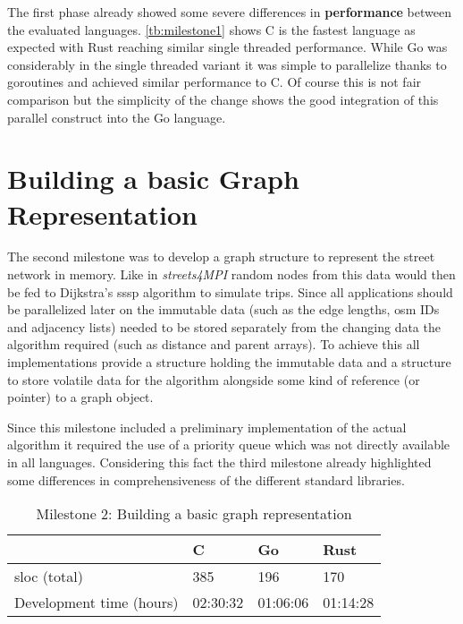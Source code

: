 The first phase already showed some severe differences in \textbf{performance} between the evaluated languages. \autoref{tb:milestone1} shows C is the fastest language as expected with Rust reaching similar single threaded performance. While Go was considerably in the single threaded variant it was simple to parallelize thanks to \glspl{goroutine} and achieved similar performance to C. Of course this is not fair comparison but the simplicity of the change shows the good integration of this parallel construct into the Go language.

\section{Building a basic Graph Representation}
\label{sec:Implementation::Graph_Representation}

The second milestone was to develop a graph structure to represent the street network in memory. Like in \textit{streets4MPI} random nodes from this data would then be fed to Dijkstra's \acrshort{sssp} algorithm to simulate trips. Since all applications should be parallelized later on the immutable data (such as the edge lengths, \gls{osm} IDs and adjacency lists) needed to be stored separately from the changing data the algorithm required (such as distance and parent arrays). To achieve this all implementations provide a  structure holding the immutable data and a  structure to store volatile data for the algorithm alongside some kind of reference (or pointer) to a graph object.

Since this milestone included a preliminary implementation of the actual algorithm it required the use of a priority queue which was not directly available in all languages. Considering this fact the third milestone already highlighted some differences in comprehensiveness of the different standard libraries.

\begin{table}[htb]
    \centering
    \begin{tabular}{llll}
        \toprule
            & C
            & Go
            & Rust \\
        \midrule

        \gls{sloc} (total)
            & 385
            & 196
            & 170 \\

        Development time (hours)
            & 02:30:32
            & 01:06:06
            & 01:14:28 \\
        \bottomrule
    \end{tabular}
    \caption{Milestone 2: Building a basic graph representation}
    \label{tb:milestone2}
\end{table}

